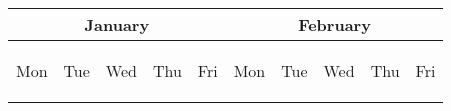 \begin{center}
\begin{small}
\begin{tabular}{||l|l|l|l|l||l|l|l|l|l||}
\hline
\multicolumn{5}{||c||}{January}&\multicolumn{5}{c||}{February}\\
\hline
\begin{minipage}{1cm}{\begin{center}Mon\end{center}}\end{minipage}&
\begin{minipage}{1cm}{\begin{center}Tue\end{center}}\end{minipage}&
\begin{minipage}{1cm}{\begin{center}Wed\end{center}}\end{minipage}&
\begin{minipage}{1cm}{\begin{center}Thu\end{center}}\end{minipage}&
\begin{minipage}{1cm}{\begin{center}Fri\end{center}}\end{minipage}&
\begin{minipage}{1cm}{\begin{center}Mon\end{center}}\end{minipage}&
\begin{minipage}{1cm}{\begin{center}Tue\end{center}}\end{minipage}&
\begin{minipage}{1cm}{\begin{center}Wed\end{center}}\end{minipage}&
\begin{minipage}{1cm}{\begin{center}Thu\end{center}}\end{minipage}&
\begin{minipage}{1cm}{\begin{center}Fri\end{center}}\end{minipage}\\

\end{tabular}
\end{small}
\end{center}
